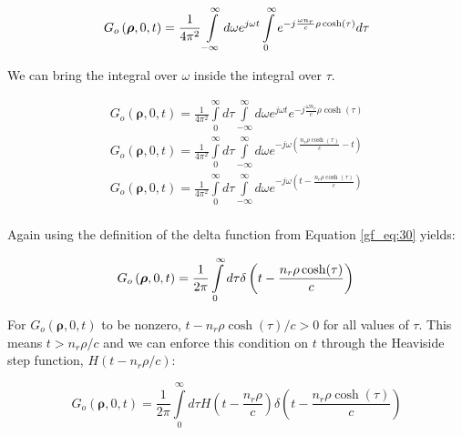 \begin{equation}
G_o\left(\boldsymbol{\rho},0,t\right) = \frac{1}{4\pi^2}\int\limits_{-\infty}^{\infty}d\omega e^{j\omega t} \int\limits_{0}^{\infty}e^{-j\frac{\omega n_r}{c}\rho\cosh(\tau)}d\tau\\
\label{gf_eq:40d}
\end{equation}
\renewcommand{\baselinestretch}{2} \small\normalsize

\noindent We can bring the integral over $\omega$ inside the integral over $\tau$.

\begin{equation}
\begin{gathered}
G_o\left(\boldsymbol{\rho},0,t\right) = \frac{1}{4\pi^2}\int\limits_{0}^{\infty}d\tau\int\limits_{-\infty}^{\infty}d\omega e^{j\omega t} e^{-j\frac{\omega n_r}{c}\rho\cosh(\tau)}\\
G_o\left(\boldsymbol{\rho},0,t\right) = \frac{1}{4\pi^2}\int\limits_{0}^{\infty}d\tau\int\limits_{-\infty}^{\infty}d\omega e^{-j\omega \left(\frac{n_r\rho \cosh(\tau)}{c} - t\right)}\\
G_o\left(\boldsymbol{\rho},0,t\right) = \frac{1}{4\pi^2}\int\limits_{0}^{\infty}d\tau\int\limits_{-\infty}^{\infty}d\omega e^{-j\omega \left(t - \frac{n_r\rho \cosh(\tau)}{c}\right)}\\
\end{gathered}
\label{gf_eq:40e}
\end{equation}
\renewcommand{\baselinestretch}{2} \small\normalsize

\noindent Again using the definition of the delta function from Equation \ref{gf_eq:30} yields:

\begin{equation}
G_o\left(\boldsymbol{\rho},0,t\right) = \frac{1}{2\pi}\int\limits_{0}^{\infty}d\tau \delta\left(t - \frac{n_r\rho \cosh(\tau)}{c}\right)\\
\label{gf_eq:40f}
\end{equation}
\renewcommand{\baselinestretch}{2} \small\normalsize

For $G_o\left(\boldsymbol{\rho},0,t\right)$ to be nonzero, $t - n_r\rho \cosh(\tau)/c > 0$ for all values of $\tau$. This means $t > n_r\rho/c$ and we can enforce this condition on $t$ through the Heaviside step function, $H\left(t -n_r\rho/c\right)$:

 \begin{equation}
G_o\left(\boldsymbol{\rho},0,t\right) = \frac{1}{2\pi}\int\limits_{0}^{\infty}d\tau H\left(t -\frac{n_r\rho}{c}\right) \delta\left(t - \frac{n_r\rho \cosh(\tau)}{c}\right)
\label{gf_eq:40g}
\end{equation}
 \renewcommand{\baselinestretch}{2} \small\normalsize
 
